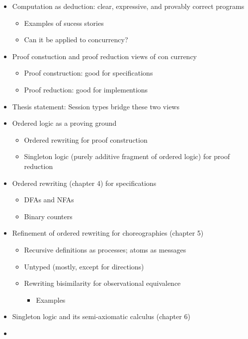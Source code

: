 \begin{itemize}
\item Computation as deduction: clear, expressive, and provably correct programs
  \begin{itemize}
  \item Examples of sucess stories
  \item Can it be applied to concurrency?
  \end{itemize}
\item Proof constuction and proof reduction views of con currency
  \begin{itemize}
  \item Proof construction: good for specifications 
  \item Proof reduction: good for implementions 
  \end{itemize}
\item Thesis statement: Session types bridge these two views
\item Ordered logic as a proving ground 
  \begin{itemize}
  \item Ordered rewriting for proof construction
  \item Singleton logic (purely additive fragment of ordered logic) for proof reduction
  \end{itemize}
\item Ordered rewriting (chapter 4) for specifications
  \begin{itemize}
  \item DFAs and NFAs 
  \item Binary counters
  \end{itemize}
\item Refinement of ordered rewriting for choreographies (chapter 5)
  \begin{itemize}
  \item Recursive definitions as processes; atoms as messages 
  \item Untyped (mostly, except for directions)
  \item Rewriting bisimilarity for observational equivalence
    \begin{itemize}
    \item Examples
    \end{itemize}
  \end{itemize}
\item Singleton logic and its semi-axiomatic calculus (chapter 6)
\item 
\end{itemize}



